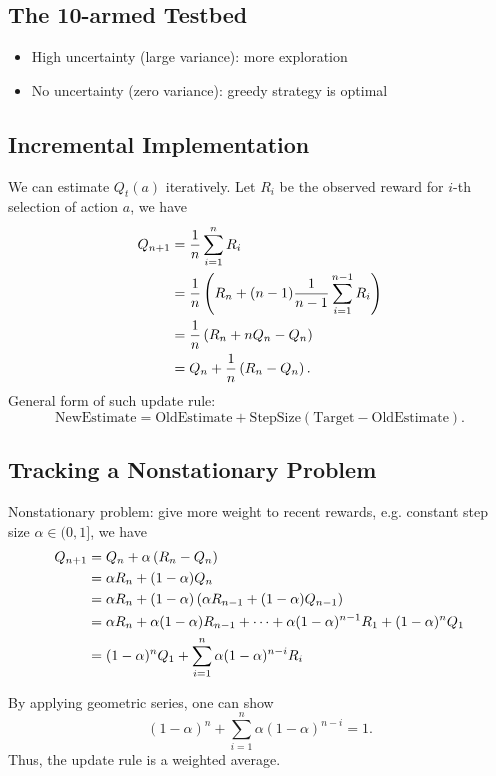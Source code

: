 \subsection{The 10-armed Testbed}
\begin{itemize}
    \item High uncertainty (large variance): more exploration
    \item No uncertainty (zero variance): greedy strategy is optimal
\end{itemize}

\subsection{Incremental Implementation}
We can estimate $Q_t(a)$ iteratively. Let $R_i$ be the observed reward for $i$-th selection of action $a$, we have
\begin{align*}
    Q_{n+1} &= \frac{1}{ {n} } \sum_{ {i}={1} }^{ {n} } R_i \\
            &= \frac{1}{n}\left( {R_n + (n-1)\frac{1}{n-1}\sum_{i=1}^{n-1}R_i} \right) \\
            &= \frac{1}{n}\left( {R_n + nQ_n - Q_n} \right) \\
            &= Q_n + \frac{1}{n}\left( {R_n - Q_n} \right).
\end{align*}
General form of such update rule: 
\begin{equation*}
    \text{NewEstimate} = \text{OldEstimate} + \text{StepSize}(\text{Target} - \text{OldEstimate}).
\end{equation*}

\subsection{Tracking a Nonstationary Problem}
Nonstationary problem: give more weight to recent rewards, e.g. constant step size $\alpha\in(0, 1]$, we have
\begin{align*}
    Q_{n+1} &= Q_n + \alpha\left( {R_n - Q_n} \right) \\
            &= \alpha R_n + (1-\alpha)Q_n \\
            &= \alpha R_n + (1-\alpha)\left( {\alpha R_{n-1} + (1-\alpha)Q_{n-1}} \right) \\
            &= \alpha R_n + \alpha(1-\alpha)R_{n-1}+\dots +\alpha(1-\alpha)^{n-1}R_1 + (1-\alpha)^n Q_1 \\
            &= (1-\alpha)^n Q_1 + \sum_{i=1}^{n}\alpha(1-\alpha)^{n-i} R_i
\end{align*}

By applying geometric series, one can show 
\begin{equation}
    (1-\alpha)^n + \sum_{i=1}^{n}\alpha(1-\alpha)^{n-i} = 1. 
\end{equation}
Thus, the update rule is a weighted average. 

